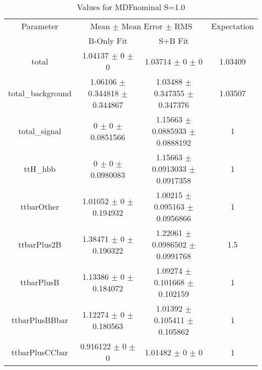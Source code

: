 \begin{table}
\centering
\caption{Values for MDFnominal S=1.0}
\begin{tabular}{cccc}
\toprule
Parameter & \multicolumn{2}{c}{Mean $\pm$ Mean Error $\pm$ RMS} & Expectation\\
 & B-Only Fit & S+B Fit & \\
\midrule
total & \num{1.04137} $\pm$ \num{0} $\pm$ \num{0} & \num{1.03714} $\pm$ \num{0} $\pm$ \num{0} & \num{1.03409}\\
total\_background & \num{1.06106} $\pm$ \num{0.344818} $\pm$ \num{0.344867} & \num{1.03488} $\pm$ \num{0.347355} $\pm$ \num{0.347376} & \num{1.03507}\\
total\_signal & \num{0} $\pm$ \num{0} $\pm$ \num{0.0851566} & \num{1.15663} $\pm$ \num{0.0885933} $\pm$ \num{0.0888192} & \num{1}\\
ttH\_hbb & \num{0} $\pm$ \num{0} $\pm$ \num{0.0980083} & \num{1.15663} $\pm$ \num{0.0913033} $\pm$ \num{0.0917358} & \num{1}\\
ttbarOther & \num{1.01052} $\pm$ \num{0} $\pm$ \num{0.194932} & \num{1.00215} $\pm$ \num{0.095163} $\pm$ \num{0.0956866} & \num{1}\\
ttbarPlus2B & \num{1.38471} $\pm$ \num{0} $\pm$ \num{0.190322} & \num{1.22061} $\pm$ \num{0.0986502} $\pm$ \num{0.0991768} & \num{1.5}\\
ttbarPlusB & \num{1.13386} $\pm$ \num{0} $\pm$ \num{0.184072} & \num{1.09274} $\pm$ \num{0.101668} $\pm$ \num{0.102159} & \num{1}\\
ttbarPlusBBbar & \num{1.12274} $\pm$ \num{0} $\pm$ \num{0.180563} & \num{1.01392} $\pm$ \num{0.105411} $\pm$ \num{0.105862} & \num{1}\\
ttbarPlusCCbar & \num{0.916122} $\pm$ \num{0} $\pm$ \num{0} & \num{1.01482} $\pm$ \num{0} $\pm$ \num{0} & \num{1}\\
\bottomrule
\end{tabular}
\end{table}